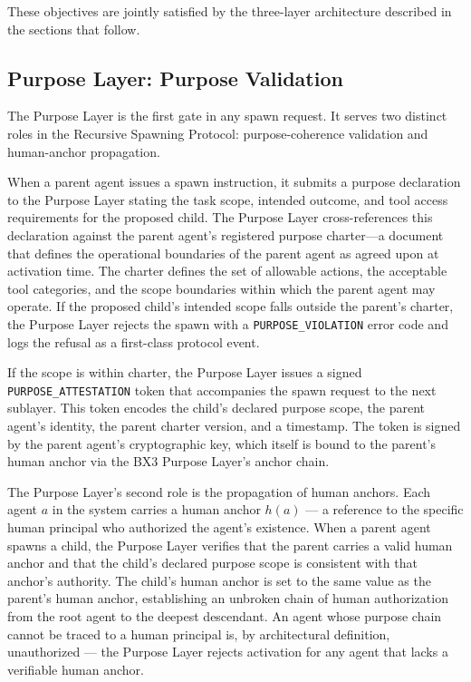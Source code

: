 These objectives are jointly satisfied by the three-layer architecture described in the sections that follow.

\subsection{Purpose Layer: Purpose Validation}

The Purpose Layer is the first gate in any spawn request. It serves two distinct roles in the Recursive Spawning Protocol: purpose-coherence validation and human-anchor propagation.

When a parent agent issues a spawn instruction, it submits a purpose declaration to the Purpose Layer stating the task scope, intended outcome, and tool access requirements for the proposed child. The Purpose Layer cross-references this declaration against the parent agent's registered purpose charter—a document that defines the operational boundaries of the parent agent as agreed upon at activation time. The charter defines the set of allowable actions, the acceptable tool categories, and the scope boundaries within which the parent agent may operate. If the proposed child's intended scope falls outside the parent's charter, the Purpose Layer rejects the spawn with a \texttt{PURPOSE\_VIOLATION} error code and logs the refusal as a first-class protocol event.

If the scope is within charter, the Purpose Layer issues a signed \texttt{PURPOSE\_ATTESTATION} token that accompanies the spawn request to the next sublayer. This token encodes the child's declared purpose scope, the parent agent's identity, the parent charter version, and a timestamp. The token is signed by the parent agent's cryptographic key, which itself is bound to the parent's human anchor via the BX3 Purpose Layer's anchor chain.

The Purpose Layer's second role is the propagation of human anchors. Each agent $a$ in the system carries a human anchor $h(a)$ — a reference to the specific human principal who authorized the agent's existence. When a parent agent spawns a child, the Purpose Layer verifies that the parent carries a valid human anchor and that the child's declared purpose scope is consistent with that anchor's authority. The child's human anchor is set to the same value as the parent's human anchor, establishing an unbroken chain of human authorization from the root agent to the deepest descendant. An agent whose purpose chain cannot be traced to a human principal is, by architectural definition, unauthorized — the Purpose Layer rejects activation for any agent that lacks a verifiable human anchor.

